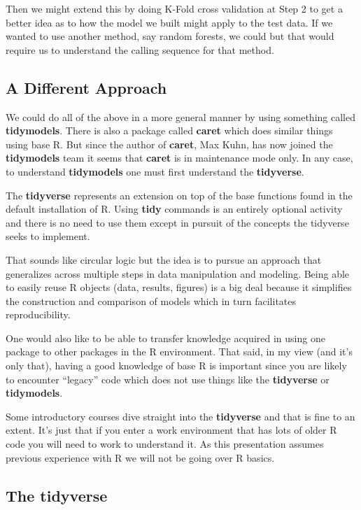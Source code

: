 \documentclass[
]{article}
\begin{document}
Then we might extend this by doing K-Fold cross validation at Step 2 to
get a better idea as to how the model we built might apply to the test
data. If we wanted to use another method, say random forests, we could
but that would require us to understand the calling sequence for that
method.

\hypertarget{a-different-approach}{%
\subsection{A Different Approach}\label{a-different-approach}}

We could do all of the above in a more general manner by using something
called \textbf{tidymodels}. There is also a package called
\textbf{caret} which does similar things using base R. But since the
author of \textbf{caret}, Max Kuhn, has now joined the
\textbf{tidymodels} team it seems that \textbf{caret} is in maintenance
mode only. In any case, to understand \textbf{tidymodels} one must first
understand the \textbf{tidyverse}.

The \textbf{tidyverse} represents an extension on top of the base
functions found in the default installation of R. Using \textbf{tidy}
commands is an entirely optional activity and there is no need to use
them except in pursuit of the concepts the tidyverse seeks to implement.

That sounds like circular logic but the idea is to pursue an approach
that generalizes across multiple steps in data manipulation and
modeling. Being able to easily reuse R objects (data, results, figures)
is a big deal because it simplifies the construction and comparison of
models which in turn facilitates reproducibility.

One would also like to be able to transfer knowledge acquired in using
one package to other packages in the R environment. That said, in my
view (and it's only that), having a good knowledge of base R is
important since you are likely to encounter ``legacy'' code which does
not use things like the \textbf{tidyverse} or \textbf{tidymodels}.

Some introductory courses dive straight into the \textbf{tidyverse} and
that is fine to an extent. It's just that if you enter a work
environment that has lots of older R code you will need to work to
understand it. As this presentation assumes previous experience with R
we will not be going over R basics.

\hypertarget{the-tidyverse}{%
\subsection{The tidyverse}\label{the-tidyverse}}
\end{document}
